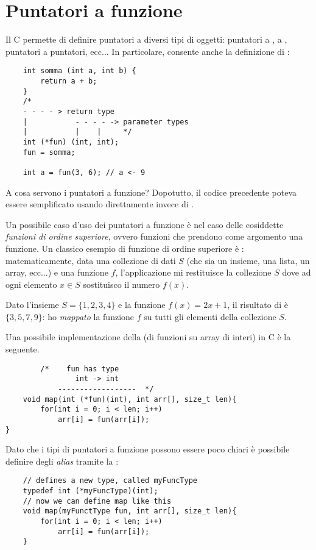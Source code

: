 \section{Puntatori a funzione}

Il C permette di definire puntatori a diversi tipi di oggetti: puntatori a , a , puntatori a puntatori, ecc...
In particolare, consente anche la definizione di :

\begin{verbatim}
    int somma (int a, int b) {
        return a + b;
    }
    /*
    - - - - > return type
    |           - - - - -> parameter types
    |           |    |     */
    int (*fun) (int, int);
    fun = somma;

    int a = fun(3, 6); // a <- 9
\end{verbatim}

A cosa servono i puntatori a funzione? Dopotutto, il codice precedente poteva essere semplificato usando direttamente  invece di .

Un possibile caso d'uso dei puntatori a funzione è nel caso delle cosiddette \emph{funzioni di ordine superiore}, ovvero funzioni che prendono come argomento una funzione. Un classico esempio di funzione di ordine superiore è : matematicamente, data una collezione di dati $S$ (che sia un insieme, una lista, un array, ecc...) e una funzione $f$, l'applicazione  mi restituisce la collezione $S$ dove ad ogni elemento $x \in S$ sostituisco il numero $f(x)$.

\begin{example}
    Dato l'insieme $S = \{1, 2, 3, 4\}$ e la funzione $f(x) = 2x + 1$, il risultato di  è $\{3, 5, 7, 9\}$: ho \emph{mappato} la funzione $f$ su tutti gli elementi della collezione $S$.
\end{example}

Una possibile implementazione della  (di funzioni  su array di interi) in C è la seguente.

\begin{verbatim}
        /*    fun has type 
                int -> int
            ------------------  */
    void map(int (*fun)(int), int arr[], size_t len){
        for(int i = 0; i < len; i++)
            arr[i] = fun(arr[i]);
}
\end{verbatim}

Dato che i tipi di puntatori a funzione possono essere poco chiari è possibile definire degli \emph{alias} tramite la :
\begin{verbatim}
    // defines a new type, called myFuncType
    typedef int (*myFuncType)(int);
    // now we can define map like this
    void map(myFunctType fun, int arr[], size_t len){
        for(int i = 0; i < len; i++)
            arr[i] = fun(arr[i]);
    }
\end{verbatim}